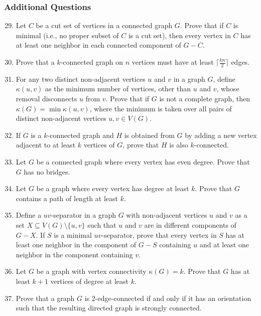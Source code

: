 \documentclass{article}
\theoremstyle{definition}
\begin{document}
\subsubsection{Additional Questions}
\begin{enumerate}\setcounter{enumi}{28}
\item Let $C$ be a cut set of vertices in a connected graph $G$. Prove that if $C$ is minimal (i.e., no proper subset of $C$ is a cut set), then every vertex in $C$ has at least one neighbor in each connected component of $G - C$.

\item Prove that a $k$-connected graph on $n$ vertices must have at least $\lceil \frac{kn}{2} \rceil$ edges.

\item For any two distinct non-adjacent vertices $u$ and $v$ in a graph $G$, define $\kappa(u,v)$ as the minimum number of vertices, other than $u$ and $v$, whose removal disconnects $u$ from $v$. Prove that if $G$ is not a complete graph, then $\kappa(G) = \min \kappa(u,v)$, where the minimum is taken over all pairs of distinct non-adjacent vertices $u, v \in V(G)$.

\item If $G$ is a $k$-connected graph and $H$ is obtained from $G$ by adding a new vertex adjacent to at least $k$ vertices of $G$, prove that $H$ is also $k$-connected.

\item Let $G$ be a connected graph where every vertex has even degree. Prove that $G$ has no bridges.

\item Let $G$ be a graph where every vertex has degree at least $k$. Prove that $G$ contains a path of length at least $k$.

\item Define a $uv$-separator in a graph $G$ with non-adjacent vertices $u$ and $v$ as a set $X \subseteq V(G) \setminus \{u,v\}$ such that $u$ and $v$ are in different components of $G - X$. If $S$ is a minimal $uv$-separator, prove that every vertex in $S$ has at least one neighbor in the component of $G - S$ containing $u$ and at least one neighbor in the component containing $v$.

\item Let $G$ be a graph with vertex connectivity $\kappa(G) = k$. Prove that $G$ has at least $k+1$ vertices of degree at least $k$.

\item Prove that a graph $G$ is 2-edge-connected if and only if it has an orientation such that the resulting directed graph is strongly connected.


\end{enumerate}
\end{document}
